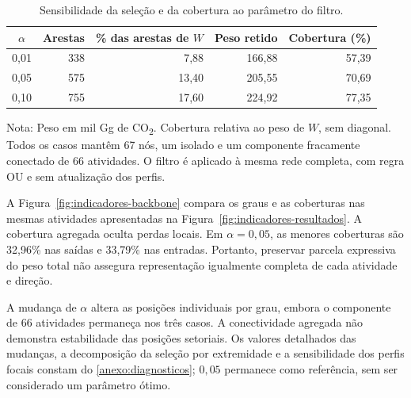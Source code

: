 \begin{table}[htbp]
\centering
\caption{Sensibilidade da seleção e da cobertura ao parâmetro do filtro.}
\label{tab:sensibilidade-backbone}
\small
\begin{tabular}{@{}crrrr@{}}
\toprule
$\alpha$ & Arestas & \% das arestas de $W$ & Peso retido & Cobertura (\%) \\
\midrule
0,01 & 338 & 7,88 & 166,88 & 57,39 \\
0,05 & 575 & 13,40 & 205,55 & 70,69 \\
0,10 & 755 & 17,60 & 224,92 & 77,35 \\
\bottomrule
\end{tabular}
\begin{notas}
Nota: Peso em mil Gg de CO\textsubscript{2}. Cobertura relativa ao peso de $W$, sem diagonal. Todos os casos mantêm 67 nós, um isolado e um componente fracamente conectado de 66 atividades. O filtro é aplicado à mesma rede completa, com regra OU e sem atualização dos perfis.
\end{notas}
\end{table}

A Figura~\ref{fig:indicadores-backbone} compara os graus e as coberturas nas mesmas atividades apresentadas na Figura~\ref{fig:indicadores-resultados}. A cobertura agregada oculta perdas locais. Em $\alpha=0{,}05$, as menores coberturas são 32,96\% nas saídas e 33,79\% nas entradas. Portanto, preservar parcela expressiva do peso total não assegura representação igualmente completa de cada atividade e direção.

A mudança de $\alpha$ altera as posições individuais por grau, embora o componente de 66 atividades permaneça nos três casos. A conectividade agregada não demonstra estabilidade das posições setoriais. Os valores detalhados das mudanças, a decomposição da seleção por extremidade e a sensibilidade dos perfis focais constam do \ref{anexo:diagnosticos}; $0{,}05$ permanece como referência, sem ser considerado um parâmetro ótimo.





